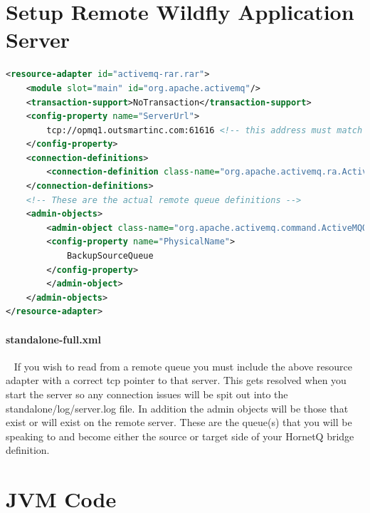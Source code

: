 \documentclass[
10pt, %
letterpaper, %
oneside, %
headinclude,footinclude, %
BCOR5mm, %
]{scrartcl}
\begin{document}

\section{Setup Remote Wildfly Application Server}


\begin{lstlisting}[language=XML]
<resource-adapter id="activemq-rar.rar">
	<module slot="main" id="org.apache.activemq"/>
	<transaction-support>NoTransaction</transaction-support>
	<config-property name="ServerUrl">
		tcp://opmq1.outsmartinc.com:61616 <!-- this address must match that of your remote setup -->
	</config-property>
	<connection-definitions>
		<connection-definition class-name="org.apache.activemq.ra.ActiveMQManagedConnectionFactory" jndi-name="java:/AMQConnectionFactory" enabled="true" use-java-context="true" pool-name="AMQConnectionFactory"/>
	</connection-definitions>
	<!-- These are the actual remote queue definitions -->
	<admin-objects>
		<admin-object class-name="org.apache.activemq.command.ActiveMQQueue" jndi-name="queue/BackupSourceQ" use-java-context="true" pool-name="target_queue">
		<config-property name="PhysicalName">
			BackupSourceQueue
		</config-property>
		</admin-object>
	</admin-objects>
</resource-adapter>
\end{lstlisting}

\paragraph{standalone-full.xml} ~\newline\newline
If you wish to read from a remote queue you must include the above resource adapter with a correct tcp pointer to that server. This gets resolved when you start the server so any connection issues will be spit out into the standalone/log/server.log file. In addition the admin objects will be those that exist or will exist on the remote server. These are the queue(s) that you will be speaking to and become either the source or target side of your HornetQ bridge definition.



\section{JVM Code}
\end{document}
